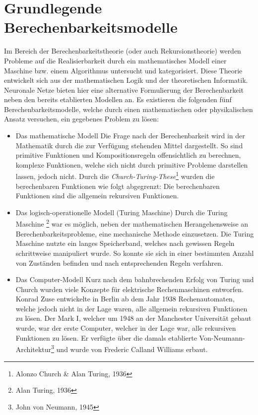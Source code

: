 \section{Grundlegende Berechenbarkeitsmodelle}
\label{sec:neuro_models}
	Im Bereich der Berechenbarkeitstheorie (oder auch Rekursionstheorie) werden Probleme auf die Realisierbarkeit durch ein mathematisches Modell einer Maschine bzw. einem Algorithmus untersucht und kategorisiert. Diese Theorie entwickelt sich aus der mathematischen Logik und der theoretischen Informatik. Neuronale Netze bieten hier eine alternative Formulierung der Berechenbarkeit neben den bereits etablierten Modellen an. Es existieren die folgenden fünf Berechenbarkeitsmodelle, welche durch einen mathematischen oder physikalischen Ansatz versuchen, ein gegebenes Problem zu lösen:
	\begin{itemize}
		\item Das mathematische Modell
			\subitem Die Frage nach der Berechenbarkeit wird in der Mathematik durch die zur Verfügung stehenden Mittel dargestellt. So sind primitive Funktionen und Kompositionsregeln offensichtlich zu berechnen, komplexe Funktionen, welche sich nicht durch primitive Probleme darstellen lassen, jedoch nicht. Durch die \textit{Church-Turing-These}\footnote{Alonzo Church \& Alan Turing, 1936} wurden die berechenbaren Funktionen wie folgt abgegrenzt: \glqq Die berechenbaren Funktionen sind die allgemein rekursiven Funktionen.\grqq
			\newpage
		\item Das logisch-operationelle Modell (Turing Maschine)
			\subitem Durch die Turing Maschine \footnote{Alan Turing, 1936} war es möglich, neben der mathematischen Herangehensweise an Berechenbarkeitsprobleme, eine mechanische Methode einzusetzen. Die Turing Maschine nutzte ein langes Speicherband, welches nach gewissen Regeln schrittweise manipuliert wurde. So konnte sie sich in einer bestimmten Anzahl von Zuständen befinden und nach entsprechenden Regeln verfahren.
		\item Das Computer-Modell
			\subitem Kurz nach dem bahnbrechenden Erfolg von Turing und Church wurden viele Konzepte für elektrische Rechenmaschinen entworfen. Konrad Zuse entwickelte in Berlin ab dem Jahr 1938 Rechenautomaten, welche jedoch nicht in der Lage waren, alle allgemein rekursiven Funktionen zu lösen. Der Mark I, welcher um 1948 an der Manchester Universität gebaut wurde, war der erste Computer, welcher in der Lage war, alle rekursiven Funktionen zu lösen. Er verfügte über die damals etablierte Von-Neumann-Architektur\footnote{John von Neumann, 1945} und wurde von Frederic Calland Williams erbaut.

\end{itemize}
